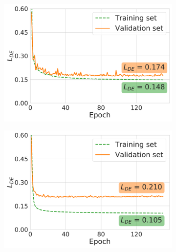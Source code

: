\begin{figure}
    \vspace{1em}

    \begin{subfigure}[b]{0.49\linewidth}
        \centering
        \includegraphics[width=\linewidth]{figures/de_5j0n.pdf}
        \caption{}
    \end{subfigure}
    \begin{subfigure}[b]{0.49\linewidth}
        \centering
        \includegraphics[width=\linewidth]{figures/de_5a1a.pdf}
        \caption{}
    \end{subfigure}
    \\ \vspace{1em}
    \begin{subfigure}[b]{0.49\linewidth}
        \centering

\end{subfigure}
\end{figure}
